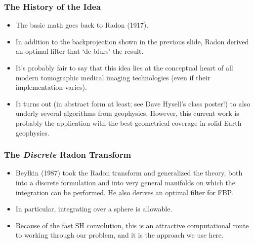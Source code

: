 \documentclass[aspectratio=43,mathserif]{beamer}
\begin{document}
\begin{frame}
\frametitle{The History of the Idea}
\begin{itemize}
\item The basic math goes back to Radon (1917). 

\item In addition to the backprojection shown in the previous slide, Radon derived an optimal filter that `de-blurs' the result.

\item It's probably fair to say that this idea lies at the conceptual heart of all modern tomographic medical imaging technologies (even if their implementation varies).

\item It turns out (in abstract form at least; see Dave Hysell's class poster!) to also underly several algorithms from geophysics. However, this current work is probably the application with the best geometrical coverage in solid Earth geophysics.
\end{itemize}
\end{frame}

\begin{frame}
\frametitle{The \emph{Discrete} Radon Transform}

\begin{itemize}

\item Beylkin (1987) took the Radon transform and generalized the theory, both into a discrete formulation and into very general manifolds on which the integration can be performed.  He also derives an optimal filter for FBP.

\item In particular, integrating over a sphere is allowable.

\item Because of the fast SH convolution, this is an attractive computational route to working through our problem, and it is the approach we use here.

\end{itemize}

\end{frame}
\end{document}
